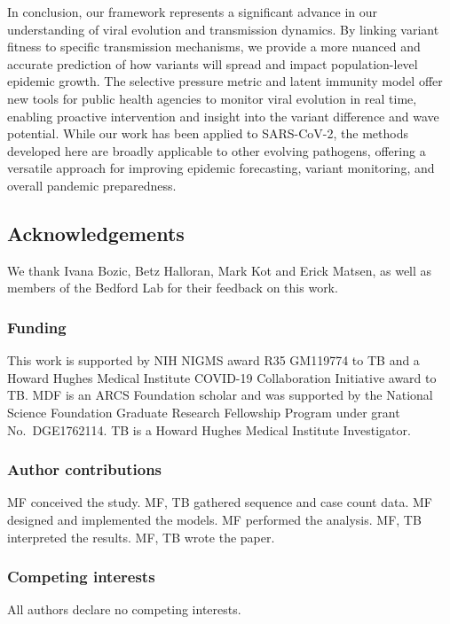 \documentclass[11pt,oneside,letterpaper]{article}
\begin{document}
In conclusion, our framework represents a significant advance in our understanding of viral evolution and transmission dynamics.
By linking variant fitness to specific transmission mechanisms, we provide a more nuanced and accurate prediction of how variants will spread and impact population-level epidemic growth.
The selective pressure metric and latent immunity model offer new tools for public health agencies to monitor viral evolution in real time, enabling proactive intervention and insight into the variant difference and wave potential.
While our work has been applied to SARS-CoV-2, the methods developed here are broadly applicable to other evolving pathogens, offering a versatile approach for improving epidemic forecasting, variant monitoring, and overall pandemic preparedness.

\subsection*{Acknowledgements}

We thank Ivana Bozic, Betz Halloran, Mark Kot and Erick Matsen, as well as members of the Bedford Lab for their feedback on this work.

\subsubsection*{Funding}

This work is supported by NIH NIGMS award R35 GM119774 to TB and a Howard Hughes Medical Institute COVID-19 Collaboration Initiative award to TB.
MDF is an ARCS Foundation scholar and was supported by the National Science Foundation Graduate Research Fellowship Program under grant No.\ DGE1762114.
TB is a Howard Hughes Medical Institute Investigator.

\subsubsection*{Author contributions}
MF conceived the study.
MF, TB gathered sequence and case count data.
MF designed and implemented the models.
MF performed the analysis.
MF, TB interpreted the results.
MF, TB wrote the paper.

\subsubsection*{Competing interests}

All authors declare no competing interests.
\end{document}
